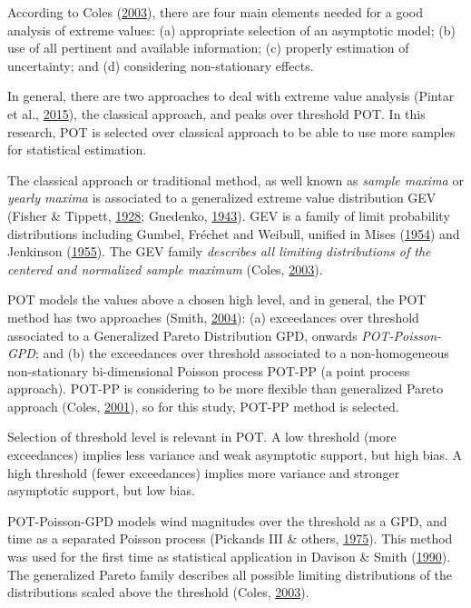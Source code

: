 \documentclass[12pt,oneside]{reedthesis}
\begin{document}
According to Coles (\protect\hyperlink{ref-Coles2003}{2003}), there are four main elements needed for a good analysis of extreme values: (a) appropriate selection of an asymptotic model; (b) use of all pertinent and available information; (c) properly estimation of uncertainty; and (d) considering non-stationary effects.

In general, there are two approaches to deal with extreme value analysis (Pintar et al., \protect\hyperlink{ref-Pintar2015}{2015}), the classical approach, and peaks over threshold POT. In this research, POT is selected over classical approach to be able to use more samples for statistical estimation.

The classical approach or traditional method, as well known as \emph{sample maxima} or \emph{yearly maxima} is associated to a generalized extreme value distribution GEV (Fisher \& Tippett, \protect\hyperlink{ref-Fisher1928}{1928}; Gnedenko, \protect\hyperlink{ref-Gnedenko1943}{1943}). GEV is a family of limit probability distributions including Gumbel, Fréchet and Weibull, unified in Mises (\protect\hyperlink{ref-Mises1954}{1954}) and Jenkinson (\protect\hyperlink{ref-Jenkinson1955}{1955}). The GEV family \emph{describes all limiting distributions of the centered and normalized sample maximum} (Coles, \protect\hyperlink{ref-Coles2003}{2003}).

POT models the values above a chosen high level, and in general, the POT method has two approaches (Smith, \protect\hyperlink{ref-Smith2004}{2004}): (a) exceedances over threshold associated to a Generalized Pareto Distribution GPD, onwards \emph{POT-Poisson-GPD}; and (b) the exceedances over threshold associated to a non-homogeneous non-stationary bi-dimensional Poisson process POT-PP (a point process approach). POT-PP is considering to be more flexible than generalized Pareto approach (Coles, \protect\hyperlink{ref-Coles2001}{2001}), so for this study, POT-PP method is selected.

Selection of threshold level is relevant in POT. A low threshold (more exceedances) implies less variance and weak asymptotic support, but high bias. A high threshold (fewer exceedances) implies more variance and stronger asymptotic support, but low bias.

POT-Poisson-GPD models wind magnitudes over the threshold as a GPD, and time as a separated Poisson process (Pickands III \& others, \protect\hyperlink{ref-PickandsIII1975}{1975}). This method was used for the first time as statistical application in Davison \& Smith (\protect\hyperlink{ref-Davison1990}{1990}). The generalized Pareto family describes all possible limiting distributions of the distributions scaled above the threshold (Coles, \protect\hyperlink{ref-Coles2003}{2003}).
\end{document}
